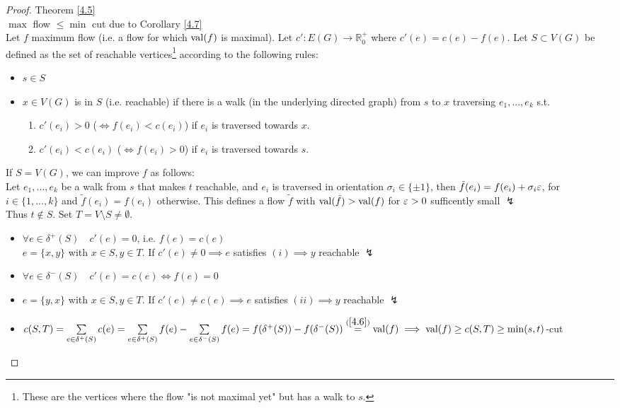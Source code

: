 \begin{proof} Theorem \ref{4.5}
    \hfill \\
    $\max$ flow $\leq\min$ cut due to Corollary \ref{4.7}\\
    Let $f$ maximum flow (i.e. a flow for which $\operatorname{val}(f)$ is maximal). Let $c':E(G)\to \mathbb{R}_0^+$ where $c'(e)=c(e)-f(e)$. Let $S\subset V(G)$ be defined as the set of reachable vertices\footnote{These are the vertices where the flow "is not maximal yet" but has a walk to $s$.} according to the following rules:
    \begin{itemize}
        \item $s\in S$
        \item $x\in V(G)$ is in $S$ (i.e. reachable) if there is a walk (in the underlying directed graph) from $s$ to $x$ traversing $e_1,...,e_k$ s.t. 
        \begin{enumerate}
            \item $c'(e_i)>0$ ($\iff f(e_i)<c(e_i)$) if $e_i$ is traversed towards $x$.
            \item $c'(e_i)<c(e_i)$ ($\iff f(e_i)>0$) if $e_i$ is traversed towards $s$.
        \end{enumerate} 
    \end{itemize}
        
    If $S=V(G)$, we can improve $f$ as follows:\\
    Let $e_1,\dots,e_k$ be a walk from $s$ that makes $t$ reachable, and $e_i$ is traversed in orientation $\sigma_i\in\{\pm 1\}$, then $\tilde{f}(e_i)=f(e_i)+\sigma_i\varepsilon$, for $i\in\{1,...,k\}$ and $\tilde{f}(e_i)=f(e_i)$ otherwise. This defines a flow $\tilde{f}$ with $\operatorname{val}(\tilde{f})>\operatorname{val}(f)$ for $\varepsilon>0$ sufficently small $\lightning$\\
    Thus $t\notin S$. Set $T=V\setminus S\neq\emptyset$.
    \begin{itemize}
        \item $\forall e\in\delta^+(S)\quad c'(e)=0$, i.e. $f(e)=c(e)$\\
        $e=\{x,y\}$ with $x\in S,y\in T$. If $c'(e)\neq 0\implies e$ satisfies $(i)\implies y $ reachable $\lightning$
        \item $\forall e\in \delta^-(S)\quad c'(e)=c(e)\iff f(e)=0$\\
        \item $e=\{y,x\}$ with $x\in S,y\in T$. If $c'(e)\neq c(e)\implies e$ satisfies $(ii)\implies y $ reachable $\lightning$
        \item $c(S,T)=\sum\limits_{e\in\delta^+(S)}c(e)=\sum\limits_{e\in\delta^+(S)}f(e)-\sum\limits_{e\in\delta^-(S)}f(e)=f(\delta^+(S))-f(\delta^-(S))\stackrel{(\ref{4.6})}{=}\operatorname{val}(f)\implies\operatorname{val}(f)\geq c(S,T)\geq \min(s,t)$-cut \qedhere
    \end{itemize}
\end{proof}

